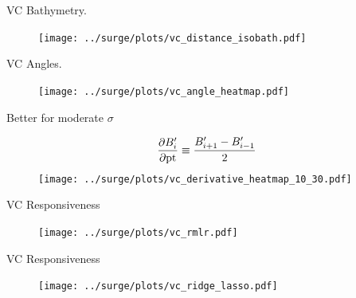 \begin{frame}{VC Bathymetry. }
\vspace{-20pt}
\begin{figure}[htb!]
  \centering
  \hspace{-10pt}
  \texttt{[image: ../surge/plots/vc\_distance\_isobath.pdf]}
  \vspace{-7pt}
  \label{fig:}
\end{figure}
\end{frame}

\begin{frame}{VC Angles. }
\vspace{-20pt}
\begin{figure}[htb!]
  \centering
  \hspace{-10pt}
  \texttt{[image: ../surge/plots/vc\_angle\_heatmap.pdf]}
  \vspace{-7pt}
  \label{fig:}
\end{figure}
\end{frame}


\begin{frame}{Better for  moderate $\sigma$}
\vspace{-20pt}
\begin{figure}[htb!]
    \centering
            \begin{equation}
        \frac{\partial B_i^{\prime}}{\partial \mathrm{pt}}
        \equiv \frac{B_{i+1}^{\prime}-B_{i-1}^{\prime}}{2} \notag
\end{equation}
    \texttt{[image: ../surge/plots/vc\_derivative\_heatmap\_10\_30.pdf]}
\end{figure}
\end{frame}


\begin{frame}{VC Responsiveness}
\vspace{-20pt}
\begin{figure}[htb!]
    \centering
    \texttt{[image: ../surge/plots/vc\_rmlr.pdf]}
\end{figure}
\end{frame}

\begin{frame}{VC Responsiveness}
\vspace{-20pt}
\begin{figure}[htb!]
    \centering
    \texttt{[image: ../surge/plots/vc\_ridge\_lasso.pdf]}
\end{figure}
\end{frame}


